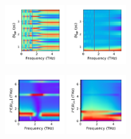 \documentclass[a4paper]{article}
\begin{document}
\begin{figure}[H]
  \centering
  \includegraphics[width=0.23\textwidth]{cond_pcolor-A1-v4-imp0.pdf}
  \includegraphics[width=0.23\textwidth]{cond_pcolor-A1-v4-imp3.pdf}
\end{figure}
\begin{figure}[H]
  \centering
  \includegraphics[width=0.23\textwidth]{cond_w_pcolor-A1-v4-imp0.pdf}
  \includegraphics[width=0.23\textwidth]{cond_w_pcolor-A1-v4-imp3.pdf}
\end{figure}



\newpage
\end{document}
